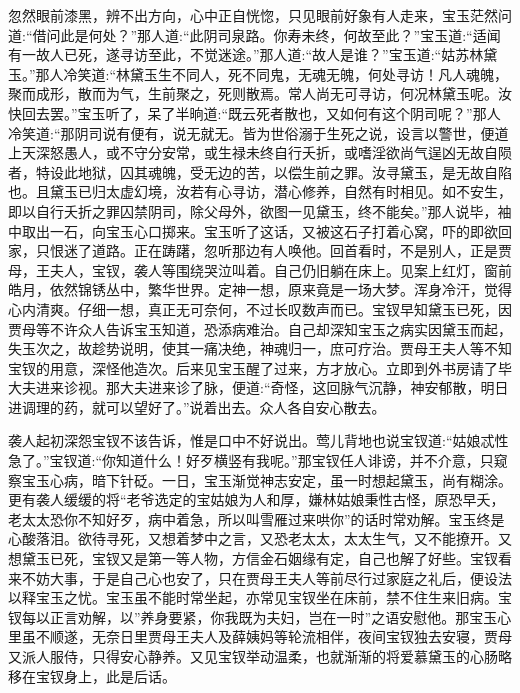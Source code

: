 \begin{parag}
    忽然眼前漆黑，辨不出方向，心中正自恍惚，只见眼前好象有人走来，宝玉茫然问道:“借问此是何处？”那人道:“此阴司泉路。你寿未终，何故至此？”宝玉道:“适闻有一故人已死，遂寻访至此，不觉迷途。”那人道:“故人是谁？”宝玉道:“姑苏林黛玉。”那人冷笑道:“林黛玉生不同人，死不同鬼，无魂无魄，何处寻访！凡人魂魄，聚而成形，散而为气，生前聚之，死则散焉。常人尚无可寻访，何况林黛玉呢。汝快回去罢。”宝玉听了，呆了半晌道:“既云死者散也，又如何有这个阴司呢？”那人冷笑道:“那阴司说有便有，说无就无。皆为世俗溺于生死之说，设言以警世，便道上天深怒愚人，或不守分安常，或生禄未终自行夭折，或嗜淫欲尚气逞凶无故自陨者，特设此地狱，囚其魂魄，受无边的苦，以偿生前之罪。汝寻黛玉，是无故自陷也。且黛玉已归太虚幻境，汝若有心寻访，潜心修养，自然有时相见。如不安生，即以自行夭折之罪囚禁阴司，除父母外，欲图一见黛玉，终不能矣。”那人说毕，袖中取出一石，向宝玉心口掷来。宝玉听了这话，又被这石子打着心窝，吓的即欲回家，只恨迷了道路。正在踌躇，忽听那边有人唤他。回首看时，不是别人，正是贾母，王夫人，宝钗，袭人等围绕哭泣叫着。自己仍旧躺在床上。见案上红灯，窗前皓月，依然锦锈丛中，繁华世界。定神一想，原来竟是一场大梦。浑身冷汗，觉得心内清爽。仔细一想，真正无可奈何，不过长叹数声而已。宝钗早知黛玉已死，因贾母等不许众人告诉宝玉知道，恐添病难治。自己却深知宝玉之病实因黛玉而起，失玉次之，故趁势说明，使其一痛决绝，神魂归一，庶可疗治。贾母王夫人等不知宝钗的用意，深怪他造次。后来见宝玉醒了过来，方才放心。立即到外书房请了毕大夫进来诊视。那大夫进来诊了脉，便道:“奇怪，这回脉气沉静，神安郁散，明日进调理的药，就可以望好了。”说着出去。众人各自安心散去。
\end{parag}


\begin{parag}
    袭人起初深怨宝钗不该告诉，惟是口中不好说出。莺儿背地也说宝钗道:“姑娘忒性急了。”宝钗道:“你知道什么！好歹横竖有我呢。”那宝钗任人诽谤，并不介意，只窥察宝玉心病，暗下针砭。一日，宝玉渐觉神志安定，虽一时想起黛玉，尚有糊涂。更有袭人缓缓的将“老爷选定的宝姑娘为人和厚，嫌林姑娘秉性古怪，原恐早夭，老太太恐你不知好歹，病中着急，所以叫雪雁过来哄你”的话时常劝解。宝玉终是心酸落泪。欲待寻死，又想着梦中之言，又恐老太太，太太生气，又不能撩开。又想黛玉已死，宝钗又是第一等人物，方信金石姻缘有定，自己也解了好些。宝钗看来不妨大事，于是自己心也安了，只在贾母王夫人等前尽行过家庭之礼后，便设法以释宝玉之忧。宝玉虽不能时常坐起，亦常见宝钗坐在床前，禁不住生来旧病。宝钗每以正言劝解，以”养身要紧，你我既为夫妇，岂在一时”之语安慰他。那宝玉心里虽不顺遂，无奈日里贾母王夫人及薛姨妈等轮流相伴，夜间宝钗独去安寝，贾母又派人服侍，只得安心静养。又见宝钗举动温柔，也就渐渐的将爱慕黛玉的心肠略移在宝钗身上，此是后话。
\end{parag}


